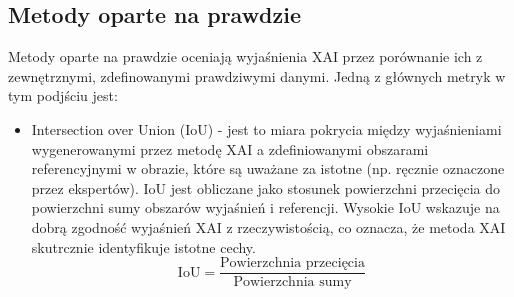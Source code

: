 \subsection*{Metody oparte na prawdzie}
Metody oparte na prawdzie oceniają wyjaśnienia XAI przez porównanie ich z zewnętrznymi, zdefinowanymi prawdziwymi danymi. Jedną z głównych metryk w tym podjściu jest:
\begin{itemize}
	\item Intersection over Union (IoU) - jest to miara pokrycia między wyjaśnieniami wygenerowanymi przez metodę XAI a zdefiniowanymi obszarami referencyjnymi w obrazie, które są uważane za istotne (np. ręcznie oznaczone przez ekspertów).
	      IoU jest obliczane jako stosunek powierzchni przecięcia do powierzchni sumy obszarów wyjaśnień i referencji. Wysokie IoU wskazuje na dobrą zgodność wyjaśnień XAI z rzeczywistością, co oznacza, że metoda XAI skutrcznie identyfikuje istotne cechy.
	      \begin{equation}
		      \text{IoU} = \frac{\text{Powierzchnia przecięcia}}{\text{Powierzchnia sumy}}
		      \label{eq:myEquation}
	      \end{equation}
\end{itemize}
